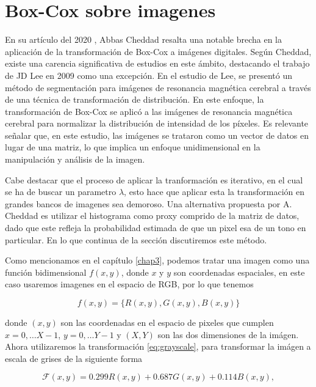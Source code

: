     \section{Box-Cox sobre imagenes} 

    En su art\'iculo del 2020 \cite{boxcoximg}, Abbas Cheddad resalta una notable brecha en la aplicaci\'on de la transformaci\'on de Box-Cox a im\'agenes digitales. Seg\'un Cheddad, existe una carencia significativa de estudios en este \'ambito, destacando el trabajo de JD Lee en 2009 como una excepci\'on\cite{lee2009mr}. En el estudio de Lee, se present\'o un m\'etodo de segmentaci\'on para im\'agenes de resonancia magn\'etica cerebral a trav\'es de una t\'ecnica de transformaci\'on de distribuci\'on. En este enfoque, la transformaci\'on de Box-Cox se aplic\'o a las im\'agenes de resonancia magn\'etica cerebral para normalizar la distribuci\'on de intensidad de los p\'ixeles. Es relevante se\~nalar que, en este estudio, las im\'agenes se trataron como un vector de datos en lugar de una matriz, lo que implica un enfoque unidimensional en la manipulaci\'on y an\'alisis de la imagen.

    Cabe destacar que el proceso de aplicar la tranformaci\'on es iterativo, en el cual se ha de buscar un parametro $\lambda$, esto hace que aplicar esta la transformaci\'on en grandes bancos de imagenes sea demoroso. Una alternativa propuesta por A. Cheddad \cite{boxcoximg} es utilizar el histograma como proxy comprido de la matriz de datos, dado que este refleja la probabilidad estimada de que un pixel esa de un tono en particular. En lo que continua de la secci\'on discutiremos este m\'etodo.

    Como mencionamos en el cap\'itulo \ref{chap3}, podemos tratar una imagen como una funci\'on bidimensional $f(x,y)$, donde $x$ y $y$ son coordenadas espaciales, en este caso usaremos imagenes en el espacio de RGB, por lo que tenemos 
    
    $$
    f(x, y)=\{R(x, y), G(x, y), B(x, y)\}
    $$

    donde $(x, y)$ son las coordenadas en el espacio de pixeles que cumplen $x=0, \ldots X-1$, $y=0, \ldots Y-1$ y $(X, Y)$ son las dos dimensiones de la im\'agen. Ahora utilizaremos la transformaci\'on \ref{eq:grayscale}, para transformar la im\'agen a escala de grises de la siguiente forma

    \begin{equation*}
        \mathcal{F}(x, y)=0.299 R(x, y)+0.687 G(x, y)+0.114 B(x, y), 
    \end{equation*}

